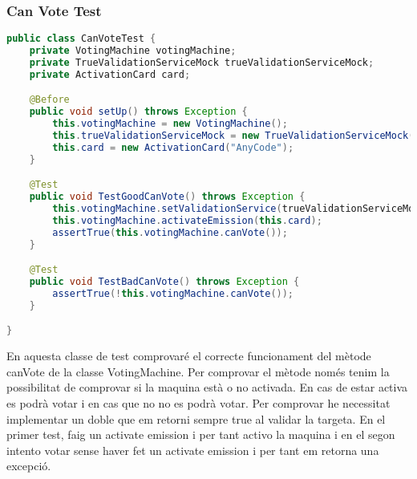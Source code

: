 \documentclass[11pt]{article}
\begin{document}
	\subsubsection{Can Vote Test}
	\begin{lstlisting}[basicstyle=\ttfamily\scriptsize,language=Java]
public class CanVoteTest {
    private VotingMachine votingMachine;
    private TrueValidationServiceMock trueValidationServiceMock;
    private ActivationCard card;

    @Before
    public void setUp() throws Exception {
        this.votingMachine = new VotingMachine();
        this.trueValidationServiceMock = new TrueValidationServiceMock();
        this.card = new ActivationCard("AnyCode");
    }

    @Test
    public void TestGoodCanVote() throws Exception {
        this.votingMachine.setValidationService(trueValidationServiceMock);
        this.votingMachine.activateEmission(this.card);
        assertTrue(this.votingMachine.canVote());
    }

    @Test
    public void TestBadCanVote() throws Exception {
        assertTrue(!this.votingMachine.canVote());
    }

}
	\end{lstlisting}
	En aquesta classe de test comprovaré el correcte funcionament del mètode canVote de la classe VotingMachine. Per comprovar el mètode només tenim la possibilitat de comprovar si la maquina està o no activada. En cas de estar activa es podrà votar i en cas que no no es podrà votar. Per comprovar he necessitat implementar un doble que em retorni sempre true al validar la targeta. En el primer test, faig un activate emission i per tant activo la maquina i en el segon intento votar sense haver fet un activate emission i per tant em retorna una excepció.
	\\\\
\end{document}
